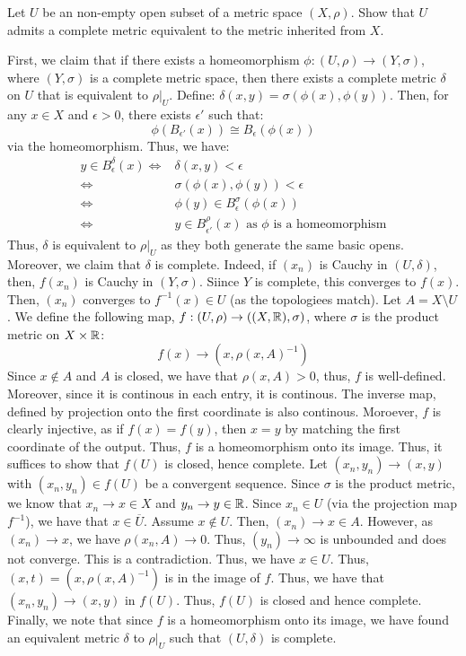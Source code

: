 \documentclass[12pt]{article}
\begin{document}
\begin{problem}{10}
    Let $U$ be an non-empty open subset of a metric space $(X, \rho)$. Show that $U$ admits a complete metric equivalent to the metric inherited from $X$.
\end{problem}
\begin{solution}
    First, we claim that if there exists a homeomorphism $\phi: (U, \rho) \to (Y, \sigma)$, where $(Y, \sigma)$ is a complete metric space, then there exists a complete metric $\delta$ on $U$ that is equivalent to $\rho|_U$. Define: $\delta(x,y) = \sigma(\phi(x), \phi(y))$. Then, for any $x \in X$ and $\epsilon > 0$, there exists $\epsilon'$ such that:
    \[\phi(B_{\epsilon'}(x)) \cong B_{\epsilon}(\phi(x))\] 
    via the homeomorphism. Thus, we have:
    \begin{align*}
        y \in B_\epsilon^\delta(x) \iff& \delta(x, y) < \epsilon \\
        \iff& \sigma(\phi(x), \phi(y)) < \epsilon \\
        \iff& \phi(y) \in B_\epsilon^\sigma(\phi(x)) \\
        \iff& y \in B_{\epsilon'}^\rho(x) \text{ as $\phi$ is a homeomorphism}
    \end{align*}
    Thus, $\delta$ is equivalent to $\rho|_U$ as they both generate the same basic opens. Moreover, we claim that $\delta$ is complete. Indeed, if $(x_n)$ is Cauchy in $(U, \delta)$, then, $f(x_n)$ is Cauchy in $(Y, \sigma)$. Siince $Y$ is complete, this converges to $f(x)$. Then, $(x_n)$ converges to $f^{-1}(x) \in U$ (as the topologiees match). \bbni
    Let $A = X \setminus U$. We define the following map, $f : (U, \rho) \to ((X, \mathbb R), \sigma)$, where $\sigma$ is the product metric on $X \times \mathbb R$: 
    \[f(x) \to (x, \rho(x, A)^{-1})\]
    Since $x \not \in A$ and $A$ is closed, we have that $\rho(x, A) > 0$, thus, $f$ is well-defined. Moreover, since it is continous in each entry, it is continous. The inverse map, defined by projection onto the first coordinate is also continous. Moroever, $f$ is clearly injective, as if $f(x) = f(y)$, then $x = y$ by matching the first coordinate of the output. Thus, $f$ is a homeomorphism onto its image. \bbni
    Thus, it suffices to show that $f(U)$ is closed, hence complete. Let $(x_n, y_n) \to (x, y)$ with $(x_n, y_n) \in f(U)$ be a convergent sequence. Since $\sigma$ is the product metric, we know that $x_n \to x \in X$ and $y_n \to y \in \mathbb R$. Since $x_n \in U$ (via the projection map $f^{-1}$), we have that $x \in \overline{U}$. \bbni 
    Assume $x \not \in U$. Then, $(x_n) \to x \in A$. However, as $(x_n) \to x$, we have $\rho(x_n, A) \to 0$. Thus, $(y_n) \to \infty$ is unbounded and does not converge. This is a contradiction. Thus, we have $x \in U$. \bbni
    Thus, $(x, t) = (x, \rho(x, A)^{-1})$ is in the image of $f$. Thus, we have that $(x_n, y_n) \to (x, y)$ in $f(U)$. Thus, $f(U)$ is closed and hence complete. \bbni
    Finally, we note that since $f$ is a homeomorphism onto its image, we have found an equivalent metric $\delta$ to $\rho|_U$ such that $(U, \delta)$ is complete.
\end{solution}
\end{document}
